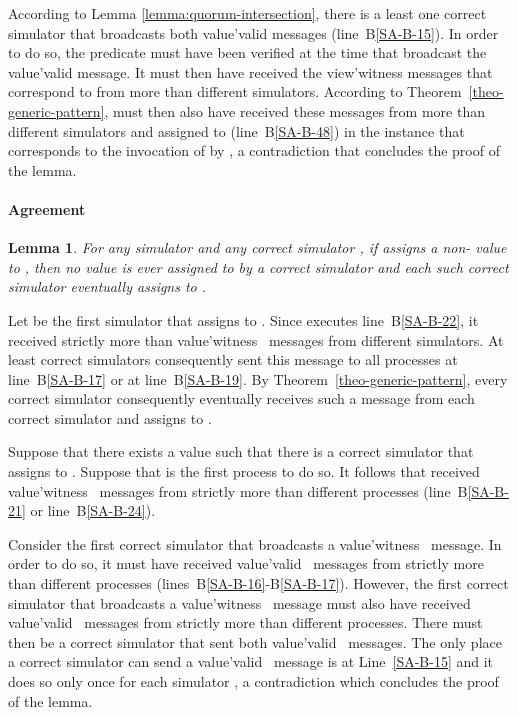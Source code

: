\documentclass[11pt,letterpaper]{article}
\newtheorem{lemma}{Lemma}
\newlength {\afterproof}
\newcommand{\toto}{xxx}
\newenvironment{proofL}{\noindent{\bf Proof }}
{\hspace*{\fill}\par\vspace{\afterproof}}
\begin{document}
\begin{proofL}
According to Lemma 
\ref{lemma:quorum-intersection}, there is a least one correct simulator 
 that broadcasts both {\sc value'valid} messages 
(line~B\ref{SA-B-15}). 
In order to 
do so, the predicate  must have been verified 
 at the time that   broadcast the 
{\sc value'valid} message. It must then have received 
the {\sc view'witness} messages that correspond to  
from more than  different 
simulators. According to Theorem~\ref{theo-generic-pattern},
 must then also have received these messages from more than 
 different 
simulators and assigned  to  (line~B\ref{SA-B-48}) 
in the instance that corresponds to the invocation of  
by , a contradiction that concludes the proof of the lemma.
\renewcommand{\toto}{lemma:at-most-one-blocked-byz}
\end{proofL}



\paragraph{Agreement}

\begin{lemma}
For any simulator  and any correct simulator , if  assigns a
non- value  to ,
then   no  value  is  ever assigned  to   by a
correct  simulator   and     each  such  correct simulator  
eventually assigns  to .
\label{lemma-byz-uniform}
\end{lemma}

\begin{proofL}
Let  be the first simulator that assigns  to .
Since  executes line~B\ref{SA-B-22},
it received strictly  more than  {\sc value'witness}~
messages from different simulators.
At least   correct  simulators consequently sent  this message  to all
processes at line~B\ref{SA-B-17} or at line~B\ref{SA-B-19}.
By Theorem~\ref{theo-generic-pattern},
every  correct  simulator    consequently eventually  receives  such  a
message from each correct simulator and assigns  to .

Suppose that there exists a value  such that
there is a correct simulator  that assigns  to .
Suppose that  is the first process to do so.
It follows that  received {\sc value'witness}~ messages
from strictly more than  different processes 
(line~B\ref{SA-B-21} or line~B\ref{SA-B-24}).

Consider the first correct simulator that broadcasts a 
{\sc value'witness}~ message. In order to do so, it must have 
received {\sc value'valid}~ messages
from strictly more than  different processes 
(lines~B\ref{SA-B-16}-B\ref{SA-B-17}).
However, the first correct simulator that broadcasts a 
{\sc value'witness}~ message must also have 
received {\sc value'valid}~ messages
from strictly more than  different processes.
There must then be a correct simulator that sent both 
{\sc value'valid}~ messages. The only place a correct simulator can 
send a {\sc value'valid}~ message is at Line~\ref{SA-B-15} and it 
does so only once for each simulator , a contradiction which concludes 
the proof of the lemma.
\renewcommand{\toto}{lemma-byz-uniform}
\end{proofL}
\end{document}
